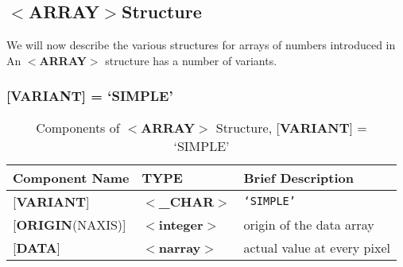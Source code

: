 \subsection{$<${\bf ARRAY}$>$Structure\label{se:sarray}}

We will now describe the various structures for arrays
of numbers introduced in 
An \mbox{$<${\bf ARRAY}$>$} structure has a number of variants.

\subsubsection{{[}{\bf VARIANT}{]} = `SIMPLE'}

\begin{table}[htb]
\centering
\caption{Components of $<${\bf ARRAY}$>$ Structure,
               {[}{\bf VARIANT}{]} = `SIMPLE'}
\begin{tabular}{|l|l|l|}
\hline
Component Name  & TYPE & Brief Description \\ \hline
{[}{\bf VARIANT}{]} & $<${\bf \_CHAR}$>$ & {\tt `SIMPLE'} \\
{[}{\bf ORIGIN}(NAXIS){]} & $<${\bf integer}$>$ & origin of the data array \\
{[}{\bf DATA}{]} & $<${\bf narray}$>$ & actual value at every pixel \\ \hline
\end{tabular}
\end{table}

